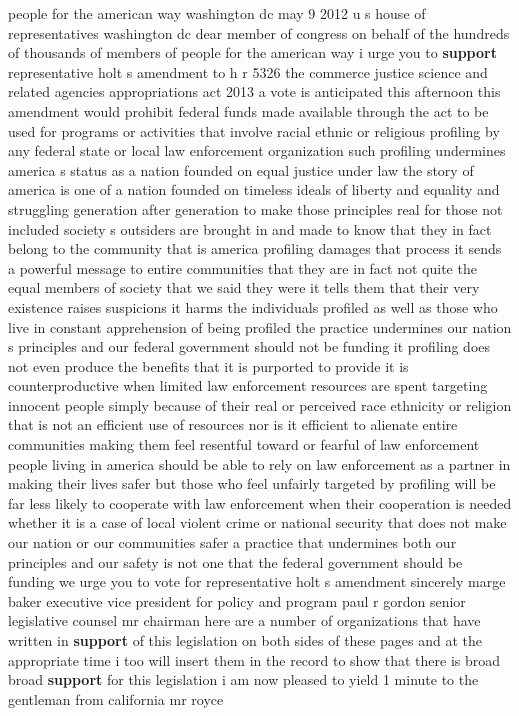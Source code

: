 \documentclass{article}
\begin{document}
people for the american way washington dc may 9 2012 u s house of representatives washington dc dear member of congress on behalf of the hundreds of thousands of members of people for the american way i urge you to {\bf \color{red} support} representative holt s amendment to h r 5326 the commerce justice science and related agencies appropriations act 2013 a vote is anticipated this afternoon this amendment would prohibit federal funds made available through the act to be used for programs or activities that involve racial ethnic or religious profiling by any federal state or local law enforcement organization such profiling undermines america s status as a nation founded on equal justice under law the story of america is one of a nation founded on timeless ideals of liberty and equality and struggling generation after generation to make those principles real for those not included society s outsiders are brought in and made to know that they in fact belong to the community that is america profiling damages that process it sends a powerful message to entire communities that they are in fact not quite the equal members of society that we said they were it tells them that their very existence raises suspicions it harms the individuals profiled as well as those who live in constant apprehension of being profiled the practice undermines our nation s principles and our federal government should not be funding it profiling does not even produce the benefits that it is purported to provide it is counterproductive when limited law enforcement resources are spent targeting innocent people simply because of their real or perceived race ethnicity or religion that is not an efficient use of resources nor is it efficient to alienate entire communities making them feel resentful toward or fearful of law enforcement people living in america should be able to rely on law enforcement as a partner in making their lives safer but those who feel unfairly targeted by profiling will be far less likely to cooperate with law enforcement when their cooperation is needed whether it is a case of local violent crime or national security that does not make our nation or our communities safer a practice that undermines both our principles and our safety is not one that the federal government should be funding we urge you to vote for representative holt s amendment sincerely marge baker executive vice president for policy and program paul r gordon senior legislative counsel
\vspace{8mm}
mr chairman here are a number of organizations that have written in {\bf \color{red} support} of this legislation on both sides of these pages and at the appropriate time i too will insert them in the record to show that there is broad broad {\bf \color{red} support} for this legislation i am now pleased to yield 1 minute to the gentleman from california mr royce
\end{document}
